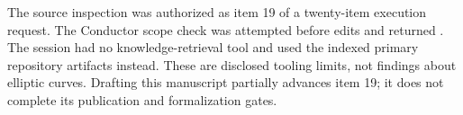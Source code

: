 The source inspection was authorized as item 19 of a twenty-item
execution request. The Conductor scope check was attempted before
edits and returned . The session had
no knowledge-retrieval tool and used the indexed primary repository
artifacts instead. These are disclosed tooling limits, not findings
about elliptic curves. Drafting this manuscript partially advances
item 19; it does not complete its publication and formalization gates.
